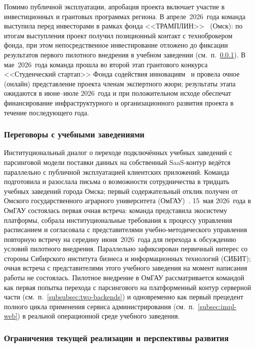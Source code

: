 Помимо публичной эксплуатации, апробация проекта включает участие в инвестиционных и грантовых программах региона. В апреле~2026~года команда выступила перед инвесторами в рамках фонда <<ТРАМПЛИН>>~\cite{tramplin} (Омск): по итогам выступления проект получил позиционный контакт с техноброкером фонда, при этом непосредственное инвестирование отложено до фиксации результатов первого пилотного внедрения в учебном заведении (см.~п.~\ref{subsubsec:impl-eval-partners}). В мае~2026~года команда прошла во второй этап грантового конкурса <<Студенческий стартап>> Фонда содействия инновациям~\cite{studstartup-fasie} и провела очное (онлайн) представление проекта членам экспертного жюри; результаты этапа ожидаются в июне--июле 2026~года и при положительном исходе обеспечат финансирование инфраструктурного и организационного развития проекта в течение последующего года.

\subsubsection{Переговоры с учебными заведениями}
\label{subsubsec:impl-eval-partners}

Институциональный диалог о переходе подключённых учебных заведений с парсинговой модели поставки данных на собственный SaaS-контур ведётся параллельно с публичной эксплуатацией клиентских приложений. Команда подготовила и разослала письма о возможности сотрудничества в тридцать учебных заведений города Омска; первый содержательный отклик получен от Омского государственного аграрного университета (ОмГАУ)~\cite{omgau}. 15~мая 2026~года в ОмГАУ состоялась первая очная встреча: команда представила экосистему платформы, собрала институциональные требования к процессу управления расписанием и согласовала с представителями учебно-методического управления повторную встречу на середину июня~2026~года для перехода к обсуждению условий пилотного внедрения. Параллельно зафиксирован первичный интерес со стороны Сибирского института бизнеса и информационных технологий (СИБИТ); очная встреча с представителями этого учебного заведения на момент написания работы не состоялась. Пилотное внедрение в ОмГАУ рассматривается командой как первая попытка перехода с парсингового на платформенный контур серверной части (см.~п.~\ref{subsubsec:two-backends}) и одновременно как первый прецедент полного цикла применения сервиса администрирования (см.~п.~\ref{subsec:impl-web}) в реальной операционной среде учебного заведения.

\subsubsection{Ограничения текущей реализации и перспективы развития}
\label{subsubsec:impl-eval-future}

